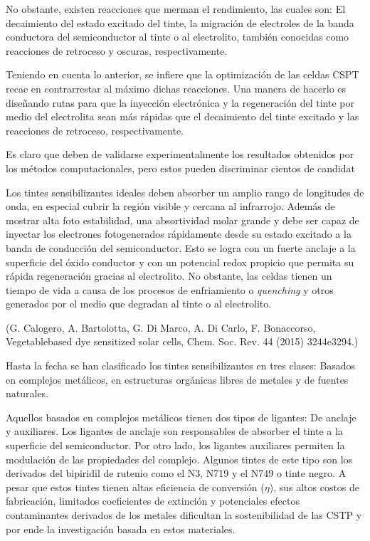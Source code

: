 
No obstante, existen reacciones que merman el rendimiento, las cuales son: El decaimiento del estado excitado del tinte, la migración de electroles de la banda conductora del semiconductor al tinte o al electrolito, también conocidas como reacciones de retroceso y oscuras, respectivamente. 

Teniendo en cuenta lo anterior, se infiere que la optimización de las celdas CSPT recae en contrarrestar al máximo dichas reacciones. Una manera de hacerlo es diseñando rutas para que la inyección electrónica y la regeneración del tinte por medio del electrolita sean más rápidas que el decaimiento del tinte excitado y las reacciones de retroceso, respectivamente. 

Es claro que deben de validarse experimentalmente los resultados obtenidos por los métodos computacionales, pero estos pueden discriminar cientos de candidat



Los tintes sensibilizantes ideales deben absorber un amplio rango de longitudes de onda, en especial cubrir la región visible y cercana al infrarrojo. Además de mostrar alta foto estabilidad, una absortividad molar grande y debe ser capaz de inyectar los electrones fotogenerados rápidamente desde su estado excitado a la banda de conducción del semiconductor. Esto se logra con un fuerte anclaje a la superficie del óxido conductor y con un potencial redox propicio que permita su rápida regeneración gracias al electrolito. No obstante, las celdas tienen un tiempo de vida a causa de los procesos de enfriamiento o \textit{quenching} y otros generados por el medio que degradan al tinte o al electrolito.

(G. Calogero, A. Bartolotta, G. Di Marco, A. Di Carlo, F. Bonaccorso, Vegetablebased
dye sensitized solar cells, Chem. Soc. Rev. 44 (2015) 3244e3294.)

Hasta la fecha se han clasificado los tintes sensibilizantes en tres clases: Basados en complejos metálicos, en estructuras orgánicas libres de metales y de fuentes naturales.

Aquellos basados en complejos metálicos tienen dos tipos de ligantes: De anclaje y auxiliares. Los ligantes de anclaje son responsables de absorber el tinte a la superficie del semiconductor. Por otro lado, los ligantes auxiliares permiten la modulación de las propiedades del complejo. Algunos tintes de este tipo son los derivados del bipiridil de rutenio como el N3, N719 y el N749 o tinte negro. A pesar que estos tintes tienen altas eficiencia de conversión ($\eta$), sus altos costos de fabricación, limitados coeficientes de extinción y potenciales efectos contaminantes derivados de los metales dificultan la sostenibilidad de las CSTP y por ende la investigación basada en estos materiales.

